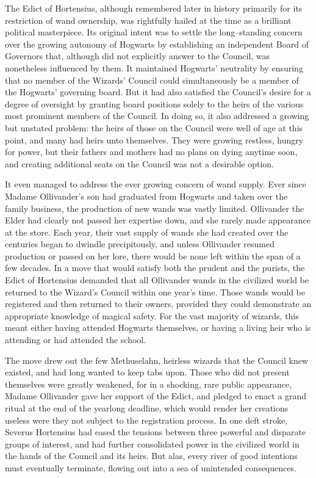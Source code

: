 The Edict of Hortensius, although remembered later in history primarily for its restriction of wand ownership, was rightfully hailed at the time as a brilliant political masterpiece. Its original intent was to settle the long\mbox{--}standing concern over the growing autonomy of Hogwarts by establishing an independent Board of Governors that, although did not explicitly answer to the Council, was nonetheless influenced by them.
\SmallVSpace
It maintained Hogwarts’ neutrality by ensuring that no member of the Wizards’ Council could simultaneously be a member of the Hogwarts’ governing board. But it had also satisfied the Council’s desire for a degree of oversight by granting board positions solely to the heirs of the various most prominent members of the Council.
\SmallVSpace
In doing so, it also addressed a growing but unstated problem: the heirs of those on the Council were well of age at this point, and many had heirs unto themselves. They were growing restless, hungry for power, but their fathers and mothers had no plans on dying anytime soon, and creating additional seats on the Council was not a desirable option.

It even managed to address the ever growing concern of wand supply. Ever since Madame Ollivander’s son had graduated from Hogwarts and taken over the family business, the production of new wands was vastly limited. Ollivander the Elder had clearly not passed her expertise down, and she rarely made appearance at the store. Each year, their vast supply of wands she had created over the centuries began to dwindle precipitously, and unless Ollivander resumed production or passed on her lore, there would be none left within the span of a few decades.
\SmallVSpace
In a move that would satisfy both the prudent and the purists, the Edict of Hortensius demanded that all Ollivander wands in the civilized world be returned to the Wizard’s Council within one year’s time. Those wands would be registered and then returned to their owners, provided they could demonstrate an appropriate knowledge of magical safety. For the vast majority of wizards, this meant either having attended Hogwarts themselves, or having a living heir who is attending or had attended the school.

The move drew out the few Methuselahn, heirless wizards that the Council knew existed, and had long wanted to keep tabs upon. Those who did not present themselves were greatly weakened, for in a shocking, rare public appearance, Madame Ollivander gave her support of the Edict, and pledged to enact a grand ritual at the end of the yearlong deadline, which would render her creations useless were they not subject to the registration process.
\SmallVSpace
In one deft stroke, Severus Hortensius had eased the tensions between three powerful and disparate groups of interest, and had further consolidated power in the civilized world in the hands of the Council and its heirs.
\SomeVSpace
But alas, every river of good intentions must eventually terminate, flowing out into a sea of unintended consequences.
\simpleline

